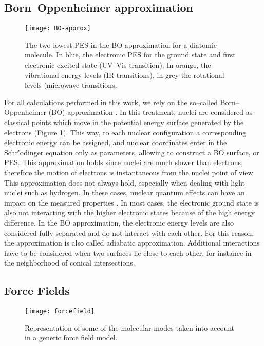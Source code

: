 \subsection*{Born--Oppenheimer approximation}

\begin{figure}[!htbp]
	\centering
 	\texttt{[image: BO-approx]}
	\caption{The two lowest PES in the BO approximation for a diatomic molecule. In blue, the electronic PES for the ground state and first electronic excited state (UV--Vis transition). In orange, the vibrational energy levels (IR transitions), in grey the rotational levels (microwave transitions.}
	\label{fig:BO-approx}
\end{figure}

For all calculations performed in this work, we rely on the so--called Born--Oppenheimer (BO) approximation \cite{Born1927}. In this treatment, nuclei are considered as classical points which move in the potential energy surface generated by the electrons (Figure \ref{fig:BO-approx}). This way, to each nuclear configuration a corresponding electronic energy can be assigned, and nuclear coordinates enter in the Schr\''{o}dinger equation only as parameters, allowing to construct a BO surface, or PES. This approximation holds since nuclei are much slower than electrons, therefore the motion of electrons is instantaneous from the nuclei point of view. 
This approximation does not always hold, especially when dealing with light nuclei such as hydrogen. In these cases, nuclear quantum effects can have an impact on the measured properties \cite{Ceriotti2016}. In most cases, the electronic ground state is also not interacting with the higher electronic states because of the high energy difference. In the BO approximation, the electronic energy levels are also considered fully separated and do not interact with each other. For this reason, the approximation is also called adiabatic approximation. Additional interactions have to be considered when two surfaces lie close to each other, for instance in the neighborhood of conical intersections. 

\subsection*{Force Fields}

\begin{figure}[!htbp]
	\centering
 	\texttt{[image: forcefield]}
	\caption{Representation of some of the molecular modes taken into account in a generic force field model.}
	\label{fig:forcefield}
\end{figure}

